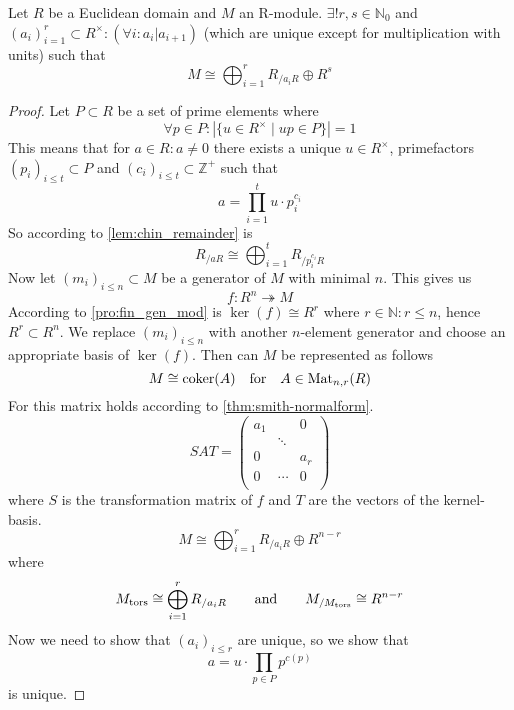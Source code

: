 \begin{theorem}\label{thm:fund_thm_mod}
   Let \(R\) be a Euclidean domain and \(M\) an R-module.
   \(\exists! r, s \in \mathbb{N}_0\) and \((a_i)_{i=1}^r \subset R^\times: (\forall i: a_i | a_{i+1})\) (which are unique except for multiplication with units) such that
   \[M \cong \bigoplus_{i=1}^r R_{/a_iR} \oplus R^s\]
\end{theorem}
\begin{proof}
   Let \(P \subset R\) be a set of prime elements where
   \[\forall p \in P: |\{u \in R^\times \mid up \in P\}| = 1\]
   This means that for \(a \in R: a \neq 0\) there exists a unique \(u \in R^\times\), primefactors \((p_i)_{i \leq t} \subset P\) and \((c_i)_{i \leq t} \subset \mathbb{Z}^+\) such that
   \[a = \prod_{i = 1}^t u \cdot p_i^{c_i}\]
   So according to \cref{lem:chin_remainder} is
   \[R_{/aR} \cong \bigoplus_{i = 1}^t R_{/p_i^{c_i} R}\]
   Now let \((m_i)_{i \leq n} \subset M\) be a generator of \(M\) with minimal \(n\).
   This gives us
   \[f: R^n \twoheadrightarrow M\]
   According to \cref{pro:fin_gen_mod} is \(\ker(f) \cong R^r\) where \(r \in \mathbb{N}: r \leq n\), hence \(R^r \subset R^n\).
   We replace \((m_i)_{i \leq n}\) with another \(n\)-element generator and choose an appropriate basis of \(\ker(f)\).
   Then can \(M\) be represented as follows
   \[M \cong \operatorname{coker}(A) \quad\text{for}\quad A \in \operatorname{Mat}_{n, r}(R)\]
   For this matrix holds according to \cref{thm:smith-normalform}.
   \[SAT = \begin{pmatrix}a_1 & & 0\\ & \ddots & \\ 0 & & a_r\\0 & \cdots & 0\\\end{pmatrix}\]
   where \(S\) is the transformation matrix of \(f\) and \(T\) are the vectors of the kernel-basis.
   \begin{equation}\label{eq:struct_thm}
      M \cong \bigoplus_{i = 1}^r R_{/a_iR} \oplus R^{n - r}
   \end{equation}
   where
   \[M_{\operatorname{tors}} \cong \bigoplus_{i = 1}^r R_{/a_iR} \qquad\text{and}\qquad M_{/M_{\operatorname{tors}}} \cong R^{n-r}\]
   Now we need to show that \((a_i)_{i \leq r}\) are unique, so we show that
   \[a = u \cdot \prod_{p \in P} p^{c(p)}\]
   is unique.


\end{proof}
